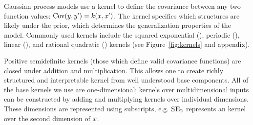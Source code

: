 \documentclass[twoside]{article}
\begin{document}
Gaussian process models use a kernel to define the covariance between any two function values: ${\textrm{Cov}(y, y') = k(x,x')}$.
The kernel specifies which structures are likely under the \gp{} prior, which determines the generalization properties of the model.
%
%
Commonly used kernels include the squared exponential (\kSE), periodic (\kPer), linear (\kLin), and rational quadratic (\kRQ) kernels  (see Figure~\ref{fig:kernels} and appendix).


Positive semidefinite kernels (\ie those which define valid covariance functions) are closed under addition and multiplication.
This allows one to create richly structured and interpretable kernel from well understood base components.
All of the base kernels we use are one-dimensional; kernels over multidimensional inputs can be constructed by adding and multiplying kernels over individual dimensions.
These dimensions are represented using subscripts, e.g. $\textsc{SE}_2$ represents an \kSE{} kernel over the second dimension of $x$.
%

\end{document}
